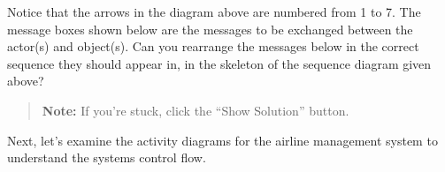 Notice that the arrows in the diagram above are numbered from 1 to 7. The message boxes shown below are the messages to be exchanged between the actor(s) and object(s). Can you rearrange the messages below in the correct sequence they should appear in, in the skeleton of the sequence diagram given above?
\begin{quote}
\textbf{Note:} If you're stuck, click the ``Show Solution'' button.
\end{quote}


Next, let's examine the activity diagrams for the airline management system to understand the system\textquotesingle s control flow.

